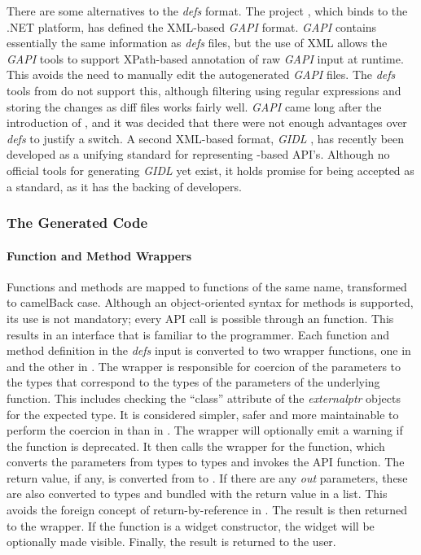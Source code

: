\documentclass[article]{jss}
\begin{document}
There are some alternatives to the \emph{defs} format. The  project 
\citep{gtksharp}, which binds  to the .NET platform, has defined
the XML-based \emph{GAPI} format. \emph{GAPI} contains essentially
the same information as \emph{defs} files, but the use of XML allows the 
\emph{GAPI} tools to support XPath-based annotation of raw \emph{GAPI} input
at runtime. This avoids the need to manually edit the autogenerated \emph{GAPI} 
files. The \emph{defs} tools from  do not support this, although
filtering using regular expressions and storing the changes as diff files
works fairly well. \emph{GAPI} came long after the introduction of , and it
was decided that there were not enough advantages over \emph{defs} to 
justify a switch. A second XML-based format, \emph{GIDL} \citep{gidl}, has
recently been developed as a unifying standard for representing -based
API's. Although no official tools for generating \emph{GIDL} yet exist, it holds
promise for being accepted as a standard, as it has the backing of  developers.

\subsubsection{The Generated Code}

\paragraph{Function and Method Wrappers}

Functions and methods are mapped to  functions of the same name, 
transformed to camelBack case. Although an object-oriented
syntax for methods is supported, its use is not mandatory; every API call
is possible through an  function. This results in an interface
that is familiar to the  programmer. Each function and method 
definition in the \emph{defs} input is converted
to two wrapper functions, one in  and the other in . 
The  wrapper is responsible for coercion of the parameters to
the  types that correspond to the  types of the parameters
of the underlying  function. This includes checking the ``class''
attribute of the \emph{externalptr} objects for the expected type. 
It is considered simpler, safer and more
maintainable to perform the coercion in  than in . The 
 wrapper will optionally emit a warning if the function is deprecated.
It then calls the  wrapper for the function, which 
converts the parameters from  types to  types and
invokes the API function. The return value, if any, is converted from 
to . If there are any \emph{out} parameters, these are also converted
to  types and bundled with the return value in a list. This avoids 
the foreign concept of return-by-reference in . The result
is then returned to the  wrapper. If the function is a widget
constructor, the widget will be optionally made visible. Finally, the result
is returned to the user.
\end{document}

